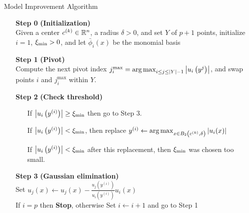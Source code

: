 \begin{algorithm}[H]
    \caption{Model Improvement Algorithm \label{alg:model_improvement} }
    \label{model_improving_algorithm}
    \begin{itemize}
        \item[\textbf{Step 0}] \textbf{(Initialization)} \\
            Given a center $c^{(k)}\in\mathbb R^n$, a radius $\delta >0$, and set $Y$ of $p+1$ points,
            initialize $i=1$, $\xi_{\text{min}} > 0$, and let $\bar \phi_i(x)$ be the monomial basis
		\item[\textbf{Step 1}] \textbf{(Pivot)} \\
			Compute the next pivot index $j^{\textrm{max}}_i = \operatorname*{arg\,max}_{i \le j \le |Y|-1} \left|u_i\left(y^j\right)\right|$,
			and swap points $i$ and $j^{\textrm{max}}_i$ within $Y$.
			
        \item[\textbf{Step 2}] \textbf{(Check threshold)} \begin{itemize}
                \item[] If $\left|u_i\left(y^{(i)}\right)\right| \ge \xi_{\text{min}}$ then go to Step 3.
                \item[] If $\left|u_i\left(y^{(i)}\right)\right| < \xi_{\text{min}}$, then replace $y^{(i)} \gets \operatorname*{arg\,max}_{x \in B_2\left(c^{(k)}, \delta\right)}\left|u_i(x)\right|$
				\item[] If $\left|u_i\left(y^{(i)}\right)\right| < \xi_{\text{min}}$ after this replacement, then $\xi_{\text{min}}$ was chosen too small.
            \end{itemize}
        \item[\textbf{Step 3}] \textbf{(Gaussian elimination)} \\
        	Set $u_j(x) \gets u_j(x) - \frac{u_j\left(y^{(i)}\right)}{u_i\left(y^{(i)}\right)} u_i(x)$ \\
            If $i = p$ then \textbf{Stop}, otherwise Set $i \gets i+1$ and go to Step 1
    \end{itemize}
\end{algorithm}


